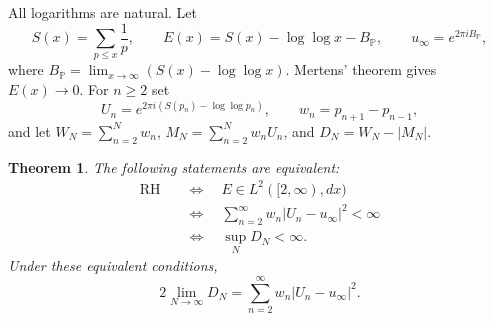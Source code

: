 \documentclass[11pt,a4paper]{article}
\newtheorem{theorem}{Theorem}[section]
\theoremstyle{definition}\newtheorem{definition}[theorem]{Definition}
\theoremstyle{remark}\newtheorem{remark}[theorem]{Remark}
\numberwithin{equation}{section}
\begin{document}
All logarithms are natural.  Let
\[
 S(x)=\sum_{p\leq x}\frac1p,
 \qquad E(x)=S(x)-\log\log x-B_{\mathbb P},
 \qquad u_\infty=e^{2\pi iB_{\mathbb P}},
\]
where $B_{\mathbb P}=\lim_{x\to\infty}(S(x)-\log\log x)$.
Mertens' theorem gives $E(x)\to0$.  For $n\geq2$ set
\[
 U_n=e^{2\pi i(S(p_n)-\log\log p_n)},\qquad
 w_n=p_{n+1}-p_{n-1},
\]
and let $W_N=\sum_{n=2}^Nw_n$, $M_N=\sum_{n=2}^Nw_nU_n$,
and $D_N=W_N-|M_N|$.

\begin{theorem}\label{r4a:criterion}
The following statements are equivalent:
\begin{equation}\label{r4a:chain}
 \begin{aligned}
 \mathrm{RH}
 &\quad\Longleftrightarrow\quad E\in L^2([2,\infty),dx)\\
 &\quad\Longleftrightarrow\quad
 \sum_{n=2}^{\infty}w_n|U_n-u_\infty|^2<\infty\\
 &\quad\Longleftrightarrow\quad \sup_ND_N<\infty.
 \end{aligned}
\end{equation}
Under these equivalent conditions,
\begin{equation}\label{r4a:limit}
 2\lim_{N\to\infty}D_N
     =\sum_{n=2}^{\infty}w_n|U_n-u_\infty|^2.
\end{equation}
\end{theorem}
\end{document}
